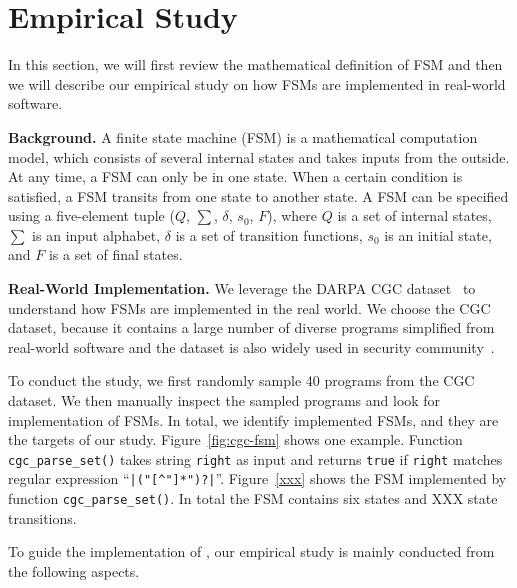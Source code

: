 \section{Empirical Study}
\label{sec:study}
In this section, we will first review the mathematical definition of FSM and then 
we will describe our empirical study on how FSMs are implemented 
in real-world software. 

\noindent\textbf{Background.}
A finite state machine (FSM) is a mathematical computation model, 
which consists of several internal states and takes inputs from the outside.
At any time, a FSM can only be in one state. 
When a certain condition is satisfied, 
a FSM transits from one state to another state. 
A FSM can be specified using a five-element tuple ($Q$, $\sum$, $\delta$, $s_0$, $F$),
where $Q$ is a set of internal states, $\sum$ is an input alphabet, 
$\delta$ is a set of transition functions,
$s_0$ is an initial state, and $F$ is a set of final states. 

\noindent\textbf{Real-World Implementation.}
We leverage the DARPA CGC dataset~\cite{CGC} to 
understand how FSMs are implemented in the real world. 
We choose the CGC dataset, because it 
contains a large number of diverse programs simplified 
from real-world software and the dataset 
is also widely used in security 
community~\cite{QSYM, Driller, VUzzer}. 


To conduct the study, we first randomly sample 
40 programs from the CGC dataset.
We then manually inspect the sampled programs and look for implementation of FSMs.
In total, we identify {\color{red}{XXX}} implemented FSMs, 
and they are the targets of our study.
Figure~\ref{fig:cgc-fsm} shows one example.
Function \texttt{cgc\_parse\_set()} takes string \texttt{right} 
as input and returns \texttt{true} if \texttt{right} matches 
regular expression ``\verb/|("[^"]*")?|/''. 
Figure~\ref{xxx} shows the FSM implemented by function \texttt{cgc\_parse\_set()}. 
In total the FSM contains six states 
and {\color{red} XXX} 
state transitions. 






To guide the implementation of \Tool{}, our empirical study 
is mainly conducted from the following aspects. 

